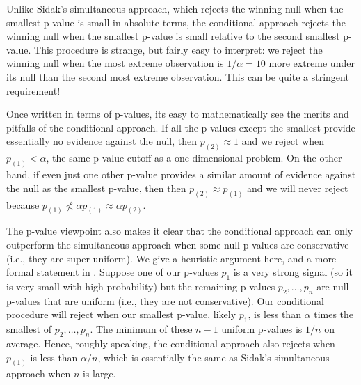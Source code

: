 \documentclass{article}
\begin{document}
Unlike Sidak's simultaneous approach, which rejects the winning null when the smallest p-value is small in absolute terms, the conditional approach rejects the winning null when the smallest p-value is small relative to the second smallest p-value. This procedure is strange, but fairly easy to interpret: we reject the winning null when the most extreme observation is $1/\alpha = 10$ more extreme under its null than the second most extreme observation. This can be quite a stringent requirement! 

Once written in terms of p-values, its easy to mathematically see the merits and pitfalls of the conditional approach. If all the p-values except the smallest provide essentially no evidence against the null,  then $p_{(2)} \approx 1$ and we reject when $p_{(1)} < \alpha$, the same p-value cutoff as a one-dimensional problem. On the other hand, if even just one other p-value provides a similar amount of evidence against the null as the smallest p-value, then then $p_{(2)} \approx p_{(1)}$ and we will never reject because $p_{(1)} \not < \alpha p_{(1)} \approx \alpha p_{(2)}$.

The p-value viewpoint also makes it clear that the conditional approach can only outperform the simultaneous approach when some null p-values are conservative (i.e., they are super-uniform). We give a heuristic argument here, and a more formal statement in . Suppose one of our p-values $p_1$ is a very strong signal (so it is very small with high probability) but the remaining p-values $p_2, \dots, p_n$ are null p-values that are uniform (i.e., they are not conservative). Our conditional procedure will reject when our smallest p-value, likely $p_1$, is less than $\alpha$ times the smallest of $p_2, \dots, p_n$. The minimum of these $n-1$ uniform p-values is $1/n$ on average. Hence, roughly speaking, the conditional approach also rejects when $p_{(1)}$ is less than $\alpha/n$, which is essentially the same as Sidak's simultaneous approach when $n$ is large. 

\end{document}
